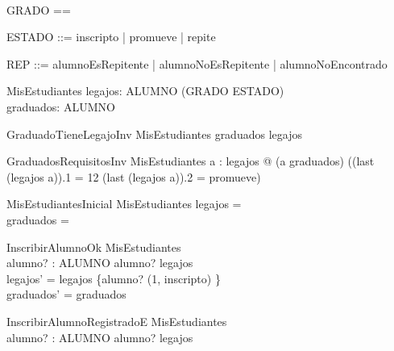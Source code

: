 \begin{zed}
    [ALUMNO] \\
\end{zed}
\begin{zed}
    GRADO == \nat \\
\end{zed}
\begin{zed}
    ESTADO ::= inscripto | promueve | repite \\
\end{zed}
\begin{zed}
    REP ::= alumnoEsRepitente | alumnoNoEsRepitente | alumnoNoEncontrado
\end{zed}

\begin{schema}{MisEstudiantes}
    legajos: ALUMNO \pfun \seq (GRADO \cross ESTADO) \\
    graduados: \power ALUMNO
\end{schema}

\begin{schema}{GraduadoTieneLegajoInv}
    MisEstudiantes
    \where
    graduados \subseteq \dom legajos
\end{schema}

\begin{schema}{GraduadosRequisitosInv}
    MisEstudiantes
    \where
    \forall a : \dom legajos @ (a \in graduados) \iff ((last (legajos a)).1 = 12 \land (last (legajos a)).2 = promueve)
\end{schema}

\begin{schema}{MisEstudiantesInicial}
    MisEstudiantes
    \where
    legajos = \emptyset \\
    graduados = \emptyset
\end{schema}

\begin{schema}{InscribirAlumnoOk}
    \Delta MisEstudiantes \\
    alumno? : ALUMNO
    \where
    alumno? \notin \dom legajos \\
    legajos' = legajos \cup \{alumno? \mapsto \langle (1, inscripto) \rangle\} \\
    graduados' = graduados
\end{schema}

\begin{schema}{InscribirAlumnoRegistradoE}
    \Xi MisEstudiantes \\
    alumno? : ALUMNO
    \where
    alumno? \in \dom legajos
\end{schema}

